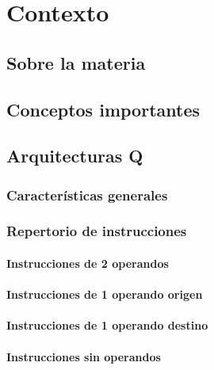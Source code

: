 \chapter{Contexto}
\section{Sobre la materia \orga}
\section{Conceptos importantes}

\section{Arquitecturas Q}

\subsection{Características generales}

\subsection{Repertorio de instrucciones}

\subsubsection{Instrucciones de 2 operandos}

\subsubsection{Instrucciones de 1 operando origen}
\subsubsection{Instrucciones de 1 operando destino}
\subsubsection{Instrucciones sin operandos}
